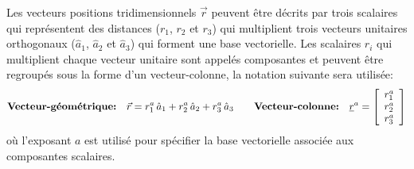 Les vecteurs positions tridimensionnels $\vec{r}$ peuvent être décrits par trois scalaires qui représentent des distances ($r_1$, $r_2$ et $r_3$) qui multiplient trois vecteurs unitaires orthogonaux ($\hat{a}_1$, $\hat{a}_2$ et $\hat{a}_3$) qui forment une base vectorielle.  Les scalaires $r_i$ qui multiplient chaque vecteur unitaire sont appelés composantes et peuvent être regroupés sous la forme d'un vecteur-colonne, la notation suivante sera utilisée:
\begin{equation}
	\text{\textbf{Vecteur-géométrique:}}\quad
	\vec{r} = r_1^a \, \hat{a}_{1} + r_2^a \, \hat{a}_{2} + r_3^a \, \hat{a}_{3}
	\quad \quad
	\text{\textbf{Vecteur-colonne:}}\quad
	\underline{r}^{a} = \left[ \begin{array}{c} r_1^a \\ r_2^a \\ r_3^a  \end{array} \right]
	\label{eq:veccoldef}
\end{equation}
où l'exposant $a$ est utilisé pour spécifier la base vectorielle associée aux composantes scalaires.





